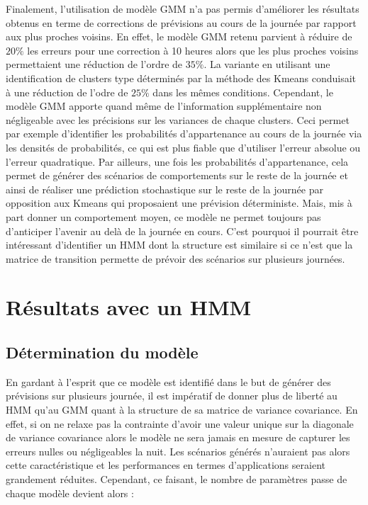 \documentclass[12pt]{report}
\begin{document}
Finalement, l'utilisation de modèle GMM n'a pas permis d'améliorer les résultats obtenus en terme de corrections de prévisions au cours de la journée par rapport aux plus proches voisins. En effet, le modèle GMM retenu parvient à réduire de $20 \%$ les erreurs pour une correction à 10 heures alors que les plus proches voisins permettaient une réduction de l'ordre de $35 \%$. La variante en utilisant une identification de clusters type déterminés par la méthode des Kmeans conduisait à une réduction de l'odre de $25 \%$ dans les mêmes conditions. Cependant, le modèle GMM apporte quand même de l'information supplémentaire non négligeable avec les précisions sur les variances de chaque clusters. Ceci permet par exemple d'identifier les probabilités d'appartenance au cours de la journée via les densités de probabilités, ce qui est plus fiable que d'utiliser l'erreur absolue ou l'erreur quadratique. Par ailleurs, une fois les probabilités d'appartenance, cela permet de générer des scénarios de comportements sur le reste de la journée et ainsi de réaliser une prédiction stochastique sur le reste de la journée par opposition aux Kmeans qui proposaient une prévision déterministe. Mais, mis à part donner un comportement moyen, ce modèle ne permet toujours pas d'anticiper l'avenir au delà de la journée en cours. C'est pourquoi il pourrait être intéressant d'identifier un HMM dont la structure est similaire si ce n'est que la matrice de transition permette de prévoir des scénarios sur plusieurs journées.  

\section{Résultats avec un HMM}
\label{sec:PV_HMM}

\subsection{Détermination du modèle}

En gardant à l'esprit que ce modèle est identifié dans le but de générer des prévisions sur plusieurs journée, il est impératif de donner plus de liberté au HMM qu'au GMM quant à la structure de sa matrice de variance covariance. En effet, si on ne relaxe pas la contrainte d'avoir une valeur unique sur la diagonale de variance covariance alors le modèle ne sera jamais en mesure de capturer les erreurs nulles ou négligeables la nuit. Les scénarios générés n'auraient pas alors cette caractéristique et les performances en termes d'applications seraient grandement réduites. Cependant, ce faisant, le nombre de paramètres passe de chaque modèle devient alors :
\end{document}
